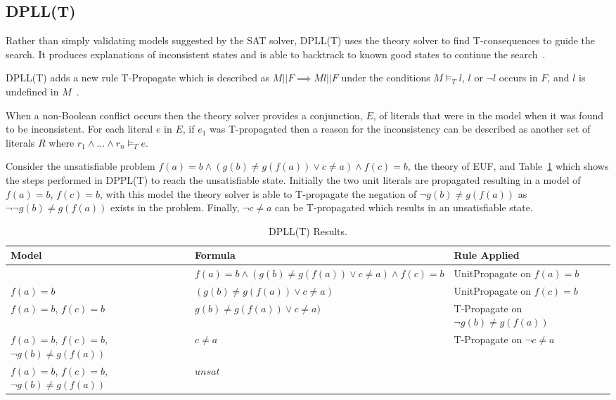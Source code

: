 \documentclass[]{final_report}
\begin{document}
\subsection{DPLL(T)}
Rather than simply validating models suggested by the SAT solver, DPLL(T) uses the theory solver to find T-consequences to guide the search. It produces explanations of inconsistent states and is able to backtrack to known good states to continue the search~\cite{smtdpplt, ganzinger2004dpll}.

DPLL(T) adds a new rule T-Propagate which is described as $M || F \implies M l || F $ under the conditions $M \models _T l$, $l$ or $\lnot l$ occurs in $F$, and $l$ is undefined in $M$~\cite{sattosmt}.

When a non-Boolean conflict occurs then the theory solver provides a conjunction, $E$, of literals that were in the model when it was found to be inconsistent. For each literal $e $ in $E$, if $e_1$ was T-propagated then a reason for the inconsistency can be described as another set of literals $R$ where $r_1 \land ... \land r_n \models _T e$. 

Consider the unsatisfiable problem $f(a) = b \land (g(b) \neq g(f(a)) \lor c \neq a) \land f(c) = b$,  the theory of EUF, and Table~\ref{table:dpll-t-results} which shows the steps performed in DPPL(T) to reach the unsatisfiable state. Initially the two unit literals are propagated resulting in a model of $f(a) = b$, $f(c) = b$, with this model the theory solver is able to T-propagate the negation of $\lnot{g(b) \neq g(f(a))}$ as $\lnot{\lnot{g(b) \neq g(f(a))}}$ exists in the problem. Finally, $\lnot{c \neq a}$ can be T-propagated which results in an unsatisfiable state.


\begin{table}[t]
\centering
\begin{tabular}{|p{4.5cm}|p{6.5cm}|p{3cm}|}
\hline
Model & Formula & Rule Applied \\ \hline
{} & $f(a) = b \land (g(b) \neq g(f(a)) \lor c \neq a) \land f(c) = b$ & UnitPropagate on $f(a) = b$   \\ \hline
{$f(a) = b$ } & $(g(b) \neq g(f(a)) \lor c \neq a)$ & UnitPropagate on $ f(c) = b$   \\ \hline
{$f(a) = b$, $f(c) = b$ } & $g(b) \neq g(f(a)) \lor c \neq a)$ & T-Propagate on $\lnot{g(b) \neq g(f(a))}$   \\ \hline
{$f(a) = b$, $f(c) = b$, $\lnot{g(b) \neq g(f(a))}$ } & $c \neq a$ & T-Propagate on $\lnot{c \neq a}$   \\ \hline
{$f(a) = b$, $f(c) = b$, $\lnot{g(b) \neq g(f(a))}$ } & $unsat$ &    \\ \hline
\end{tabular}
\caption{DPLL(T) Results.}
\label{table:dpll-t-results}
\end{table}
\end{document}
